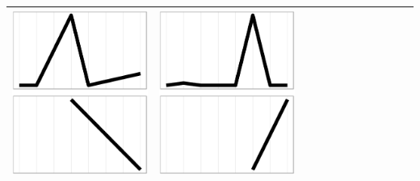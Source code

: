\documentclass[conference]{worldcomp}
\begin{document}
\begin{table}
\begin{tabular}{ | b{1.5cm} | c | c | c | c | c | c | c | c | c | c | c |}
 \includegraphics[scale=0.08]{figures/bbbb.ps} &  
 \includegraphics[scale=0.08]{figures/bbbc.ps} \\
  \hline
  \end{tabular}
\end{table}
\end{document}
